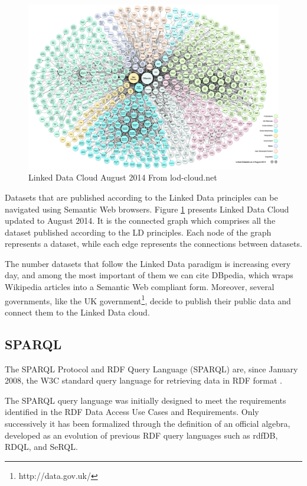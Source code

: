 \begin{figure}[tbh]
  \centering
	\includegraphics[width=\linewidth]{images/lod}
	\caption{Linked Data Cloud August 2014 From lod-cloud.net} 
  	\label{fig:lod}
\end{figure}

Datasets that are published according to the Linked Data principles can be navigated using Semantic Web browsers. Figure \ref{fig:lod} presents  Linked Data Cloud updated to August 2014. It is the connected graph which comprises all the dataset published according to the LD principles. Each node of the graph represents a dataset, while each edge represents the connections between datasets.

The number datasets that follow the Linked Data paradigm is increasing every day, and among the most important of them we can cite DBpedia, which wraps Wikipedia articles into a Semantic Web compliant form. Moreover, several governments, like the UK government\footnote{http://data.gov.uk/}, decide to publish their public data and connect them to the Linked Data cloud. 

\subsection{SPARQL}\label{sec:sparql}

The SPARQL Protocol and RDF Query Language (SPARQL) are, since January 2008, the W3C standard query language for retrieving data in RDF format \cite{prudhommeaux_sparql_2008}.

The SPARQL query language was initially designed to meet the requirements identified in the RDF Data Access Use Cases and Requirements. Only successively it has been formalized through the definition of an official algebra, developed as an evolution of previous RDF query languages such as rdfDB, RDQL, and SeRQL.

